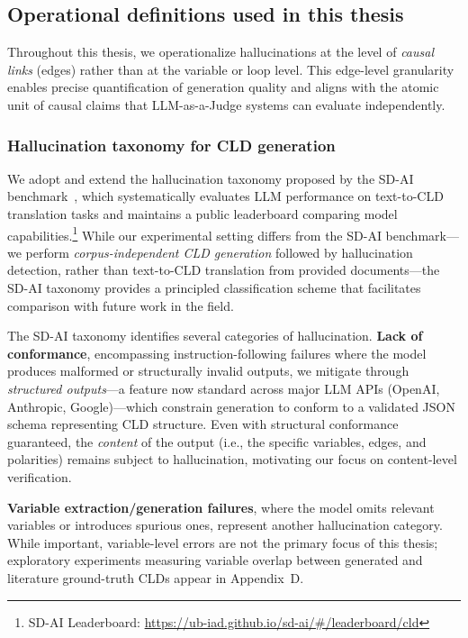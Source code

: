 \subsection{Operational definitions used in this thesis}
\label{sec:background_operational_definitions}

Throughout this thesis, we operationalize hallucinations at the level of \emph{causal links} (edges) rather than at the variable or loop level. This edge-level granularity enables precise quantification of generation quality and aligns with the atomic unit of causal claims that LLM-as-a-Judge systems can evaluate independently.

\subsubsection{Hallucination taxonomy for CLD generation}

We adopt and extend the hallucination taxonomy proposed by the SD-AI benchmark~\citep{schoenberg2025aibuildsdmodels}, which systematically evaluates LLM performance on text-to-CLD translation tasks and maintains a public leaderboard comparing model capabilities.\footnote{SD-AI Leaderboard: \url{https://ub-iad.github.io/sd-ai/\#/leaderboard/cld}} While our experimental setting differs from the SD-AI benchmark---we perform \emph{corpus-independent CLD generation} followed by hallucination detection, rather than text-to-CLD translation from provided documents---the SD-AI taxonomy provides a principled classification scheme that facilitates comparison with future work in the field.

The SD-AI taxonomy identifies several categories of hallucination. \textbf{Lack of conformance}, encompassing instruction-following failures where the model produces malformed or structurally invalid outputs, we mitigate through \emph{structured outputs}---a feature now standard across major LLM APIs (OpenAI, Anthropic, Google)---which constrain generation to conform to a validated JSON schema representing CLD structure. Even with structural conformance guaranteed, the \emph{content} of the output (i.e., the specific variables, edges, and polarities) remains subject to hallucination, motivating our focus on content-level verification.

\textbf{Variable extraction/generation failures}, where the model omits relevant variables or introduces spurious ones, represent another hallucination category. While important, variable-level errors are not the primary focus of this thesis; exploratory experiments measuring variable overlap between generated and literature ground-truth CLDs appear in Appendix~D.

